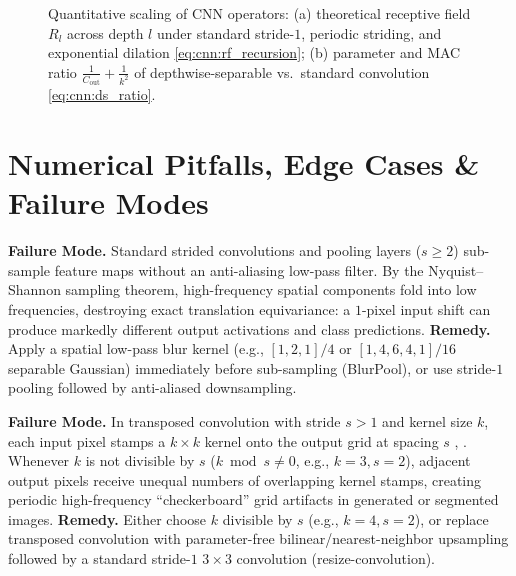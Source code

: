 \documentclass[../../../../master.tex]{subfiles}
\begin{document}
\begin{figure}[htbp]
\begin{minipage}[t]{0.48\textwidth}
\end{minipage}
\caption{Quantitative scaling of CNN operators: (a) theoretical receptive field $R_l$ across depth $l$ under standard stride-$1$, periodic striding, and exponential dilation \eqref{eq:cnn:rf_recursion}; (b) parameter and MAC ratio $\frac{1}{C_{\mathrm{out}}} + \frac{1}{k^2}$ of depthwise-separable vs.\ standard convolution \eqref{eq:cnn:ds_ratio}.}
\label{fig:cnn:pgfplots_rf_eff}
\end{figure}

\section{Numerical Pitfalls, Edge Cases \& Failure Modes}
\label{sec:cnn:pitfalls}

\begin{pitfall}
\label{box:cnn:aliasing}
\textbf{Failure Mode.} Standard strided convolutions and pooling layers ($s \ge 2$) sub-sample feature maps without an anti-aliasing low-pass filter. By the Nyquist--Shannon sampling theorem, high-frequency spatial components fold into low frequencies, destroying exact translation equivariance: a $1$-pixel input shift can produce markedly different output activations and class predictions.
\textbf{Remedy.} Apply a spatial low-pass blur kernel (e.g., $[1, 2, 1]/4$ or $[1, 4, 6, 4, 1]/16$ separable Gaussian) immediately before sub-sampling (BlurPool), or use stride-$1$ pooling followed by anti-aliased downsampling.
\end{pitfall}

\begin{pitfall}
\label{box:cnn:checkerboard}
\textbf{Failure Mode.} In transposed convolution with stride $s > 1$ and kernel size $k$, each input pixel stamps a $k \times k$ kernel onto the output grid at spacing $s$ , . Whenever $k$ is not divisible by $s$ ($k \bmod s \neq 0$, e.g., $k=3, s=2$), adjacent output pixels receive unequal numbers of overlapping kernel stamps, creating periodic high-frequency ``checkerboard'' grid artifacts in generated or segmented images.
\textbf{Remedy.} Either choose $k$ divisible by $s$ (e.g., $k=4, s=2$), or replace transposed convolution with parameter-free bilinear/nearest-neighbor upsampling followed by a standard stride-$1$ $3 \times 3$ convolution (resize-convolution).
\end{pitfall}
\end{document}
